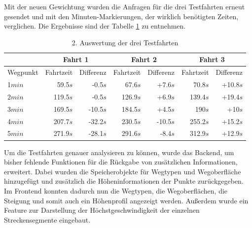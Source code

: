 Mit der neuen Gewichtung wurden die Anfragen für die drei Testfahrten erneut gesendet und mit den Minuten-Markierungen, der wirklich benötigten Zeiten, verglichen.
Die Ergebnisse sind der Tabelle \ref{tab:all} zu entnehmen.

\begin{table}[htb]
\centering
\caption{2. Auswertung der drei Testfahrten}
\label{tab:all}
\begin{tabular}{|l|r|r|r|r|r|r|}
\hhline{~|-|-|-|-|-|-}
\multicolumn{1}{l|}{} & \multicolumn{2}{c|}{Fahrt 1} & \multicolumn{2}{c|}{Fahrt 2} & \multicolumn{2}{c|}{Fahrt 3} \\ \hline
Wegpunkt              & Fahrtzeit   & Differenz     & Fahrtzeit   & Differenz     & Fahrtzeit  & Differenz      \\ \hline 
1$min$                & 59.5$s$     & -0.5$s$        & 67.6$s$     & +7.6$s$        & 70.8$s$    & +10.8$s$        \\
2$min$                & 119.5$s$    & -0.5$s$        & 126.9$s$    & +6.9$s$        & 139.4$s$   & +19.4$s$        \\
3$min$                & 169.5$s$    & -10.5$s$       & 184.5$s$    & +4.5$s$        & 190$s$     & +10$s$          \\
4$min$                & 207.7$s$    & -32.2$s$       & 230.5$s$    & -10.5$s$       & 255.2$s$   & +15.2$s$        \\
5$min$                & 271.9$s$    & -28.1$s$       & 291.6$s$    & -8.4$s$        & 312.9$s$   & +12.9$s$        \\
\hline
\end{tabular}
\end{table}


Um die Testfahrten genauer analysieren zu können, wurde das Backend, um bisher fehlende Funktionen für die Rückgabe von zusätzlichen Informationen, erweitert.
Dabei wurden die Speicherobjekte für Wegtypen und Wegoberfläche hinzugefügt und zusätzlich die Höheninformationen der Punkte zurückgegeben.
Im Frontend konnten dadurch nun die Wegtypen, die Wegoberflächen, die Steigung und somit auch ein Höhenprofil angezeigt werden.
Außerdem wurde ein Feature zur Darstellung der Höchstgeschwindigkeit der einzelnen Streckensegmente eingebaut.